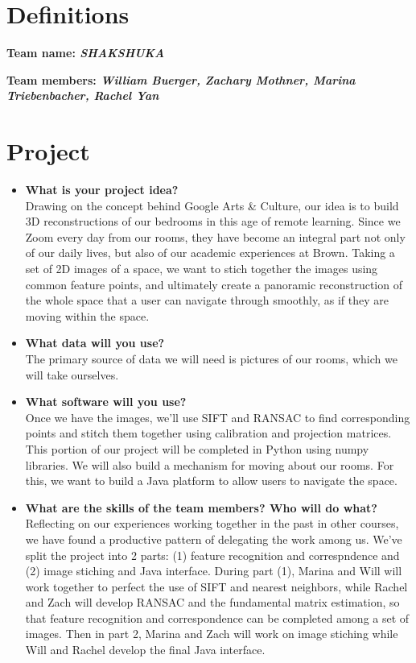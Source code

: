 \section*{Definitions}

\textbf{Team name: \emph{SHAKSHUKA}}

\textbf{Team members: \emph{William Buerger, Zachary Mothner, Marina Triebenbacher, Rachel Yan}}\\


\section*{Project}
\begin{itemize}
  \item \textbf{What is your project idea?} \\
  Drawing on the concept behind Google Arts \& Culture, our idea is to build 3D reconstructions of our bedrooms in this age of remote learning. Since we Zoom every day from our rooms, they have become an integral part not only of our daily lives, but also of our academic experiences at Brown. Taking a set of 2D images of a space, we want to stich together the images using common feature points, and ultimately create a panoramic reconstruction of the whole space that a user can navigate through smoothly, as if they are moving within the space.
  \item \textbf{What data will you use?} \\
  The primary source of data we will need is pictures of our rooms, which we will take ourselves.
  \item \textbf{What software will you use?} \\
  Once we have the images, we'll use SIFT and RANSAC to find corresponding points and stitch them together using calibration and projection matrices. This portion of our project will be completed in Python using numpy libraries. We will also build a mechanism for moving about our rooms. For this, we want to build a Java platform to allow users to navigate the space.
  \item \textbf{What are the skills of the team members? Who will do what?} \\
  Reflecting on our experiences working together in the past in other courses, we have found a productive pattern of delegating the work among us. We've split the project into 2 parts: (1) feature recognition and correspndence and (2) image stiching and Java interface. During part (1), Marina and Will will work together to perfect the use of SIFT and nearest neighbors, while Rachel and Zach will develop RANSAC and the fundamental matrix estimation, so that feature recognition and correspondence can be completed among a set of images. Then in part 2, Marina and Zach will work on image stiching while Will and Rachel develop the final Java interface.


\end{itemize}
